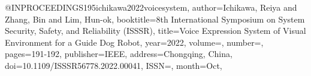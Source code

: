 @INPROCEEDINGS{195ichikawa2022voicesystem,
author={Ichikawa, Reiya and Zhang, Bin and Lim, Hun-ok},
booktitle={8th International Symposium on System Security, Safety, and Reliability (ISSSR)}, 
title={Voice Expression System of Visual Environment for a Guide Dog Robot}, 
year={2022},
volume={},
number={},
pages={191-192},
publisher={IEEE},
address={Chongqing, China},
doi={10.1109/ISSSR56778.2022.00041},
ISSN={},
month={Oct},}